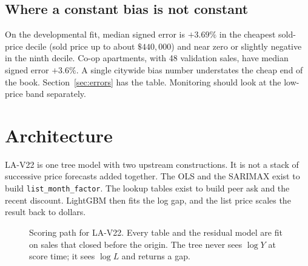 \documentclass[11pt]{article}
\newcommand{\modelid}{LA-V22}
\begin{document}
\subsection{Where a constant bias is not constant}

On the developmental fit, median signed error is \(+3.69\%\) in the cheapest sold-price decile (sold price up to about \(\$440{,}000\)) and near zero or slightly negative in the ninth decile. Co-op apartments, with 48 validation sales, have median signed error \(+3.6\%\). A single citywide bias number understates the cheap end of the book. Section~\ref{sec:errors} has the table. Monitoring should look at the low-price band separately.

\section{Architecture}
\label{sec:architecture}

\modelid{} is one tree model with two upstream constructions. It is not a stack of successive price forecasts added together. The OLS and the SARIMAX exist to build \texttt{list\_month\_factor}. The lookup tables exist to build peer ask and the recent discount. LightGBM then fits the log gap, and the list price scales the result back to dollars.

\begin{figure}[ht]
\centering
{}
\caption{Scoring path for \modelid{}. Every table and the residual model are fit on sales that closed before the origin. The tree never sees \(\log Y\) at score time; it sees \(\log L\) and returns a gap.}
\label{fig:flow}
\end{figure}
\end{document}
